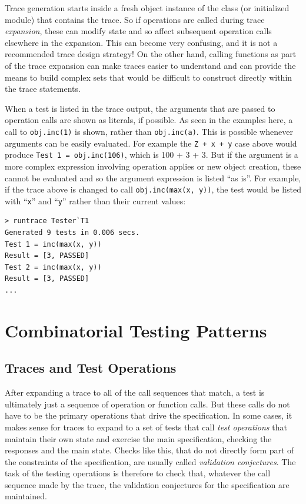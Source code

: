\documentclass{overturerepchap}
\begin{document}
Trace generation starts inside a fresh object instance of the class (or
initialized module) that contains the trace. So if operations are called during
trace \emph{expansion}, these can modify state and so affect subsequent
operation calls elsewhere in the expansion. This can become very confusing, and
it is not a recommended trace design strategy! On the other hand, calling
functions as part of the trace expansion can make traces easier to understand
and can provide the means to build complex sets that would be difficult to
construct directly within the trace statements.

When a test is listed in the trace output, the arguments that are passed to
operation calls are shown as literals, if possible. As seen in the examples
here, a call to \texttt{obj.inc(1)} is shown, rather than \texttt{obj.inc(a)}. This is
possible whenever arguments can be easily evaluated. For example the \texttt{Z
+ x + y} case above would produce \texttt{Test 1 = obj.inc(106)}, which is 100 +
3 + 3. But if the argument is a more complex expression involving operation
applies or new object creation, these cannot be evaluated and so the argument
expression is listed ``as is''. For example, if the trace above is changed to
call \texttt{obj.inc(max(x, y))}, the test would be listed with ``\texttt{x}''
and ``\texttt{y}'' rather than their current values:

\small
\lstset{style=tool,language=}
\begin{lstlisting}[escapechar=@]
> runtrace Tester`T1
Generated 9 tests in 0.006 secs. 
Test 1 = inc(max(x, y))
Result = [3, PASSED]
Test 2 = inc(max(x, y))
Result = [3, PASSED]
...
\end{lstlisting}
\lstset{style=mystyle}
\lstset{language=VDM++}
\normalsize

\chapter{Combinatorial Testing Patterns}
\label{chap:patterns}

\section{Traces and Test Operations}

After expanding a trace to all of the call sequences that match, a
test is ultimately just a sequence of operation or function calls. But these
calls do not have to be the primary operations that drive the specification. In
some cases, it makes sense for traces to expand to a set of tests that call
\emph{test operations} that maintain their own state and exercise the main
specification, checking the responses and the main state. Checks like this, that
do not directly form part of the constraints of the specification, are usually
called \emph{validation conjectures}. The task of the testing operations is
therefore to check that, whatever the call sequence made by the trace, the
validation conjectures for the specification are maintained.
\end{document}
